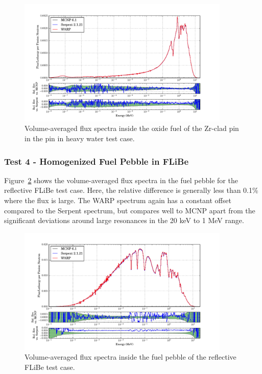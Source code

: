 \documentclass[preprint,12pt]{elsarticle}
\begin{document}
\begin{figure}[h!]
\centering
\includegraphics[width=0.9\textwidth,trim= 1cm 0cm 1cm 0cm]{graphics/pincell_spec.pdf}
\caption{Volume-averaged flux spectra inside the oxide fuel of the Zr-clad pin in the pin in heavy water test case. \label{pincell_spec} }
\end{figure}

\newpage
\subsubsection{Test 4 - Homogenized Fuel Pebble in FLiBe}

Figure~\ref{flibe_spec} shows the volume-averaged flux spectra in the fuel pebble for the reflective FLiBe test case.  Here, the relative difference is generally less than 0.1\% where the flux is large.  The WARP spectrum again has a constant offset compared to the Serpent spectrum, but compares well to MCNP apart from the significant deviations around large resonances in the 20 keV to 1 MeV range.  

\begin{figure}[h!]
\centering
\includegraphics[width=0.9\textwidth,trim= 1cm 0cm 1cm 0cm]{graphics/flibe_spec.pdf}
\caption{Volume-averaged flux spectra inside the fuel pebble of the reflective FLiBe test case. \label{flibe_spec} }
\end{figure}
\end{document}
